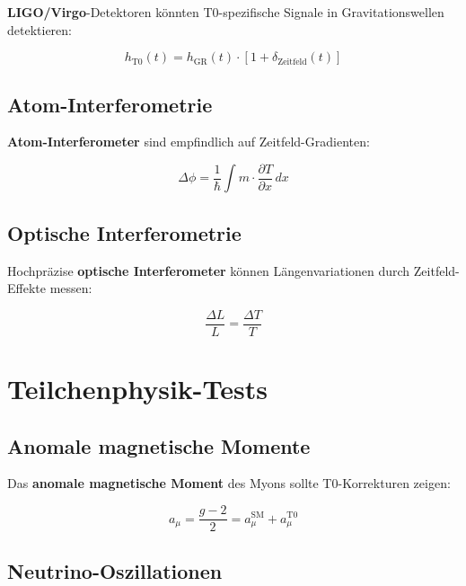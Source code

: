 \documentclass[12pt,a4paper]{report}
\begin{document}
	\textbf{LIGO/Virgo}-Detektoren könnten T0-spezifische Signale in Gravitationswellen detektieren:
	
	\begin{equation}
		h_{\text{T0}}(t) = h_{\text{GR}}(t) \cdot \left[1 + \delta_{\text{Zeitfeld}}(t)\right]
	\end{equation}
	
	\subsection{Atom-Interferometrie}
	
	\textbf{Atom-Interferometer} sind empfindlich auf Zeitfeld-Gradienten:
	
	\begin{equation}
		\Delta\phi = \frac{1}{\hbar}\int m \cdot \frac{\partial T}{\partial x} \, dx
	\end{equation}
	
	\subsection{Optische Interferometrie}
	
	Hochpräzise \textbf{optische Interferometer} können Längenvariationen durch Zeitfeld-Effekte messen:
	
	\begin{equation}
		\frac{\Delta L}{L} = \frac{\Delta T}{T}
	\end{equation}
	
	\section{Teilchenphysik-Tests}
	
	\subsection{Anomale magnetische Momente}
	
	Das \textbf{anomale magnetische Moment} des Myons sollte T0-Korrekturen zeigen:
	
	\begin{equation}
		a_\mu = \frac{g-2}{2} = a_\mu^{\text{SM}} + a_\mu^{\text{T0}}
	\end{equation}
	
	\subsection{Neutrino-Oszillationen}
	
\end{document}
